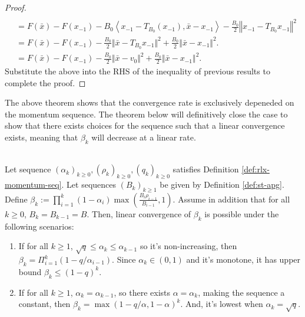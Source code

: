 \documentclass[12pt]{article}
\begin{document}
\begin{proof}
\begin{align*}
                \\
                &=
                F(\bar x) - F(x_{-1}) 
                - B_0\left\langle x_{-1} - T_{B_0}(x_{-1}), \bar x - x_{-1} \right\rangle
                - \frac{B_0}{2}\left\Vert x_{-1} - T_{B_0}x_{-1}\right\Vert^2
                \\
                &= 
                F(\bar x) - F(x_{-1}) 
                - \frac{B_0}{2}\Vert \bar x - T_{B_0}x_{-1}\Vert^2 
                + \frac{B_0}{2}\Vert \bar x - x_{-1}\Vert^2. 
                \\
                &= F(\bar x) - F(x_{-1}) 
                - \frac{B_0}{2}\Vert \bar x - v_0\Vert^2 
                + \frac{B_0}{2}\Vert \bar x - x_{-1}\Vert^2. 
            \end{align*}
            Substitute the above into the RHS of the inequality of previous results to complete the proof. 
        \end{proof}
        \par
        The above theorem shows that the convergence rate is exclusively depeneded on the momentum sequence. 
        The theorem below will definitively close the case to show that there exists choices for the sequence such that a linear convergence exists, meaning that $\beta_k$ will decrease at a linear rate. 
        \begin{lemma}\;\label{lemma:beta-seq}\\
            Let sequence $(\alpha_k)_{k \ge 0}, (\rho_{k})_{k \ge 0}, (q_k)_{k \ge 0}$ satisfies Definition \ref{def:rlx-momentum-seq}.
            Let sequences $(B_k)_{k \ge 1}$ be given by Definition \ref{def:st-apg}. 
            Define $\beta_k := \prod_{i = 1}^k(1 - \alpha_i) \max \left(\frac{B_i\rho_{i - 1}}{B_{i - 1}}, 1\right)$.
            Assume in addition that for all $k \ge 0$, $B_k = B_{k - 1} = B$. 
            Then, linear convergence of $\beta_k$ is possible under the following scenarios: 
            \begin{enumerate}
                \item If for all $k \ge 1$, $\sqrt{q} \le \alpha_k \le \alpha_{k - 1}$ so it's non-increasing, then $\beta_k = \Pi_{i = 1}^k(1 - q/\alpha_{i - 1})$.
                Since $\alpha_k \in (0, 1)$ and it's monotone, it has upper bound $\beta_k \le (1 - q)^k$. 
                \item If for all $k \ge 1$, $\alpha_k = \alpha_{k - 1}$, so there exists $\alpha = \alpha_k$, making the sequence a constant, then $\beta_k = \max(1 - q/\alpha, 1 - \alpha)^k$. And, it's lowest when $\alpha_k = \sqrt{q}$. 
            \end{enumerate}
        \end{lemma}
\end{document}
